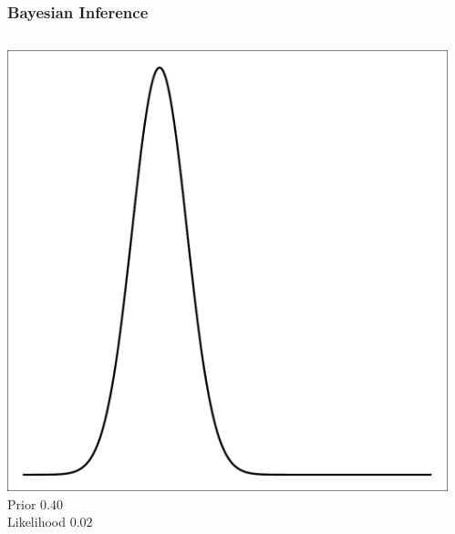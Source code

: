 \documentclass{beamer}
\begin{document}
\begin{frame}[t]
    \frametitle{Bayesian Inference}
    \begin{columns}[c]
            \begin{flushright}
                \includegraphics[width=1\textwidth]{bayesian_update_illustration_th1.pdf}\\
                \vspace{10pt}
                \Large Prior \hfill $0.40$\\
                \vspace{20pt}
                \Large Likelihood \hfill $0.02$\\
            \end{flushright}
            \begin{flushright}

\end{flushright}
\end{columns}
\end{frame}
\end{document}

